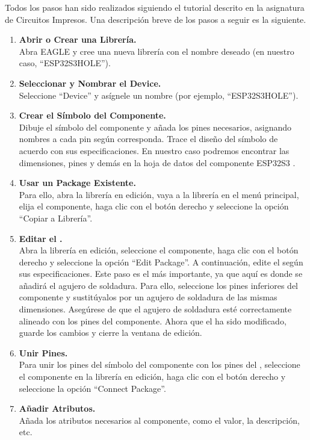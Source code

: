 Todos los pasos han sido realizados siguiendo el tutorial descrito en la asignatura de Circuitos Impresos. Una descripción breve de los pasos a seguir es la siguiente.

\begin{enumerate}
    \item \textbf{Abrir o Crear una Librería.}\\
    Abra EAGLE y cree una nueva librería con el nombre deseado (en nuestro caso, ``ESP32S3HOLE'').
    \item \textbf{Seleccionar y Nombrar el Device.}\\
    Seleccione ``Device'' y asígnele un nombre (por ejemplo, ``ESP32S3HOLE'').
    \item \textbf{Crear el Símbolo del Componente.}\\
    Dibuje el símbolo del componente y añada los pines necesarios, asignando nombres a cada pin según corresponda. Trace el diseño del símbolo de acuerdo con sus especificaciones. En nuestro caso podremos encontrar las dimensiones, pines y demás en la hoja de datos del componente ESP32S3 \cite{ESP32S3Datasheet}.
    \item \textbf{Usar un Package Existente.}\\
    Para ello, abra la librería en edición, vaya a la librería en el menú principal, elija el componente, haga clic con el botón derecho y seleccione la opción ``Copiar a Librería''.\\
    \item \textbf{Editar el .}\\
    Abra la librería en edición, seleccione el componente, haga clic con el botón derecho y seleccione la opción ``Edit Package''. A continuación, edite el  según sus especificaciones.
    Este paso es el más importante, ya que aquí es donde se añadirá el agujero de soldadura. Para ello, seleccione los pines inferiores del componente y sustitúyalos por un agujero de soldadura de las mismas dimensiones. Asegúrese de que el agujero de soldadura esté correctamente alineado con los pines del componente.
    Ahora que el  ha sido modificado, guarde los cambios y cierre la ventana de edición.
    \item \textbf{Unir Pines.}\\
    Para unir los pines del símbolo del componente con los pines del , seleccione el componente en la librería en edición, haga clic con el botón derecho y seleccione la opción ``Connect Package''.
    \item \textbf{Añadir Atributos.}\\
    Añada los atributos necesarios al componente, como el valor, la descripción, etc.
\end{enumerate}

